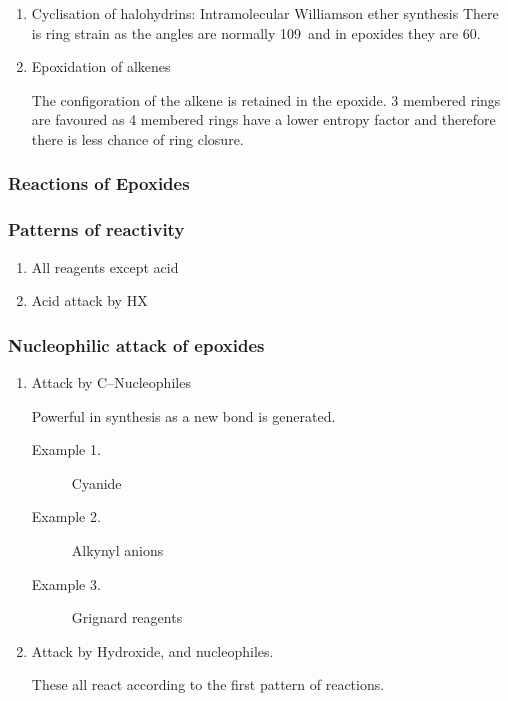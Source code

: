 \begin{enumerate}[label=\alph*)]

	\item Cyclisation of halohydrins: Intramolecular Williamson ether synthesis
		There is ring strain as the angles are normally 109\de\ and in epoxides
		they are 60\de .

	\item Epoxidation of alkenes

		The configoration of the alkene is retained in the epoxide.
		3 membered rings are favoured as 4 membered rings have a lower entropy
		factor and therefore there is less chance of ring closure.

\end{enumerate}

\subsubsection{Reactions of Epoxides}

\subsubsection{Patterns of reactivity}

\begin{enumerate}[label=\roman*)]

	\item  All reagents except acid

	\item Acid attack by HX

\end{enumerate}

\subsubsection{Nucleophilic attack of epoxides}

\begin{enumerate}[label=\roman*)]

	\item Attack by C--Nucleophiles

		Powerful in synthesis as a new  bond is generated.

		\begin{description}

			\item[Example 1.] Cyanide

			\item[Example 2.] Alkynyl anions

			\item[Example 3.] Grignard reagents

		\end{description}

	\item Attack by Hydroxide,  and   nucleophiles.

		These all react according to the first pattern of reactions.

\end{enumerate}